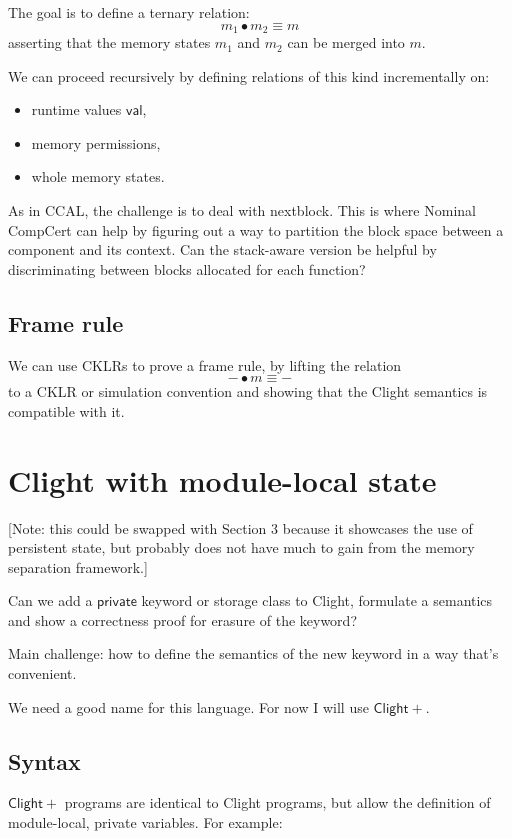 \documentclass[acmsmall,screen,review,anonymous]{acmart}
\newcommand{\ClightP}{\ensuremath{\mathsf{Clight+}}}
\begin{document}
The goal is to define a ternary relation:
\[
    m_1 \bullet m_2 \equiv m
\]
asserting that the memory states $m_1$ and $m_2$
can be merged into $m$.

We can proceed recursively by defining
relations of this kind incrementally on:
\begin{itemize}
  \item runtime values $\mathsf{val}$,
  \item memory permissions,
  \item whole memory states.
\end{itemize}

As in CCAL,
the challenge is to deal with nextblock.
This is where Nominal CompCert can help
by figuring out a way to partition the block space
between a component and its context.
Can the stack-aware version be helpful
by discriminating between blocks allocated
for each function?

\subsection{Frame rule}

We can use CKLRs to prove a frame rule,
by lifting the relation
\[
    {-} \bullet m \equiv {-}
\]
to a CKLR or simulation convention
and showing that the Clight semantics
is compatible with it.

\section{Clight with module-local state}

[Note: this could be swapped with Section 3
because it showcases the use of persistent state,
but probably does not have much to gain
from the memory separation framework.]

Can we add a $\mathsf{private}$ keyword or storage class to Clight,
formulate a semantics and show a correctness proof
for erasure of the keyword?

Main challenge: how to define the semantics of the new keyword
in a way that's convenient.

We need a good name for this language.
For now I will use \ClightP{}.

\subsection{Syntax}

\ClightP{} programs are identical to Clight programs,
but allow the definition of module-local, private variables.
For example:
\end{document}
